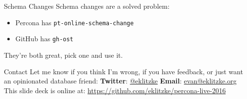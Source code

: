 \documentclass[14pt]{beamer}
\begin{document}
\begin{frame}{Schema Changes}
  Schema changes are a solved problem:
  \begin{itemize}
    \item Percona has \texttt{pt-online-schema-change}
    \item GitHub has \texttt{gh-ost}
  \end{itemize}
  They're both great, pick one and use it.
\end{frame}

\begin{frame}{Contact}
  Let me know if you think I'm wrong, if you have feedback, or just want an
  opinionated database friend:
  \newline
  \newline
  \textbf{Twitter}: \href{https://twitter.com/eklitzke}{@eklitzke}
  \newline
  \textbf{Email}: \href{mailto:evan@eklitzke.org}{evan@eklitzke.org}
  \newline
  \newline
  This slide deck is online at:
  \href{https://github.com/eklitzke/percona-live-2016}{https://github.com/eklitzke/percona-live-2016}
\end{frame}
\end{document}
